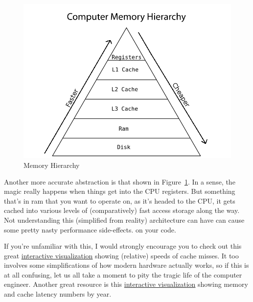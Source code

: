 \begin{figure}[ht]
  \centering
  \includegraphics[scale=.54]{./include/pics/memory}
  \caption{Memory Hierarchy}
  \label{fig:mem}
\end{figure}
Another more accurate abstraction is that shown in Figure~\ref{fig:mem}.  In a 
sense, the magic really happens when things get into the CPU registers.  But 
something that's in ram that you want to operate on, as it's headed to the CPU, 
it gets cached into various levels of (comparatively) fast access storage along 
the way. Not understanding this (simplified from reality) architecture can have 
can cause some pretty nasty performance side-effects. on your code.

If you're unfamiliar with this, I would strongly encourage you to check out 
this great
\href{http://www.overbyte.com.au/misc/Lesson3/CacheFun.html}%
{interactive visualization} 
showing (relative) speeds of cache misses. It too involves some simplifications 
of how modern hardware actually works, so if this is at all confusing, let us 
all take a moment to pity the tragic life of the computer engineer.  Another 
great resource is this
\href{http://www.eecs.berkeley.edu/~rcs/research/interactive_latency.html}%
{interactive visualization} showing memory and cache latency numbers by year.





